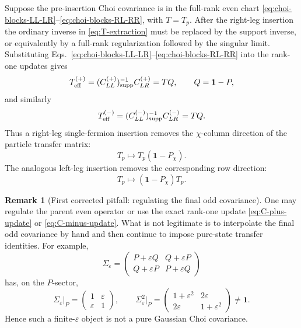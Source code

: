 \documentclass[aps,prb,onecolumn,nofootinbib,superscriptaddress]{revtex4-2}
\newcommand{\I}{\mathbf{1}}
\newcommand{\eps}{\varepsilon}
\theoremstyle{plain}
\theoremstyle{definition}
\newtheorem{remark}{Remark}
\begin{document}
Suppose the pre-insertion Choi covariance is in the full-rank even chart
\eqref{eq:choi-blocks-LL-LR}--\eqref{eq:choi-blocks-RL-RR}, with
\(T=T_p\).  After the right-leg insertion the ordinary inverse in
\eqref{eq:T-extraction} must be replaced by the support inverse, or
equivalently by a full-rank regularization followed by the singular limit.
Substituting Eqs.~\eqref{eq:choi-blocks-LL-LR}--\eqref{eq:choi-blocks-RL-RR}
into the rank-one updates gives
\begin{equation}
  T_{\rm eff}^{(+)}
  =
  (C_{LL}^{(+)})^{-1}_{\rm supp}C_{LR}^{(+)}
  =
  TQ,
  \qquad
  Q=\I-P ,
  \label{eq:Teff-plus}
\end{equation}
and similarly
\begin{equation}
  T_{\rm eff}^{(-)}
  =
  (C_{LL}^{(-)})^{-1}_{\rm supp}C_{LR}^{(-)}
  =
  TQ .
  \label{eq:Teff-minus}
\end{equation}
Thus a right-leg single-fermion insertion removes the \(\chi\)-column
direction of the particle transfer matrix:
\begin{equation}
  T_p\longmapsto T_p(\I-P_\chi).
  \label{eq:right-leg-column-removal}
\end{equation}
The analogous left-leg insertion removes the corresponding row direction:
\begin{equation}
  T_p\longmapsto(\I-P_\chi)T_p .
  \label{eq:left-leg-row-removal}
\end{equation}

\begin{remark}[First corrected pitfall: regulating the final odd covariance]
One may regulate the parent even operator or use the exact rank-one update
\eqref{eq:C-plus-update} or \eqref{eq:C-minus-update}.  What is not legitimate
is to interpolate the final odd covariance by hand and then continue to impose
pure-state transfer identities.  For example,
\begin{equation}
  \Sigma_\eps=
  \begin{pmatrix}
    P+\eps Q & Q+\eps P\\
    Q+\eps P & P+\eps Q
  \end{pmatrix}
  \label{eq:bad-regulator}
\end{equation}
has, on the \(P\)-sector,
\begin{equation}
  \Sigma_\eps\big|_P=
  \begin{pmatrix}
    1 & \eps\\
    \eps & 1
  \end{pmatrix},
  \qquad
  \Sigma_\eps^2\big|_P=
  \begin{pmatrix}
    1+\eps^2 & 2\eps\\
    2\eps & 1+\eps^2
  \end{pmatrix}
  \neq\I .
  \label{eq:bad-regulator-square}
\end{equation}
Hence such a finite-\(\eps\) object is not a pure Gaussian Choi covariance.
\end{remark}
\end{document}
